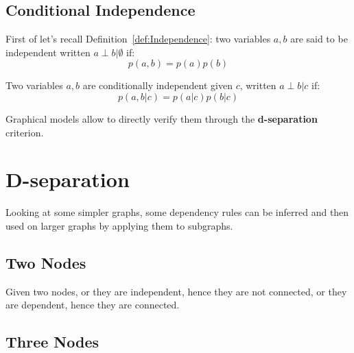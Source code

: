 \subsection{Conditional Independence}
First of let's recall Definition~\ref{def:Independence}: two variables $a,b$ are said to be independent written $a\perp b\vert\emptyset$ if: 
\[
p(a,b)=p(a)p(b)
\]
\begin{definition}
Two variables $a,b$ are conditionally independent given $c$, written $a\perp b\vert c$ if:
\[
p(a,b\vert c)=p(a\vert c)p(b\vert c)
\]
\end{definition}
Graphical models allow to directly verify them through the \textbf{d-separation} criterion.
%
%
%
\section{D-separation}
Looking at some simpler graphs, some dependency rules can be inferred and then used on larger graphs by applying them to subgraphs.\newline
%
%
\subsection{Two Nodes}
Given two nodes, or they are independent, hence they are not connected, or they are dependent, hence they are connected.
%
%
\subsection{Three Nodes}
%
